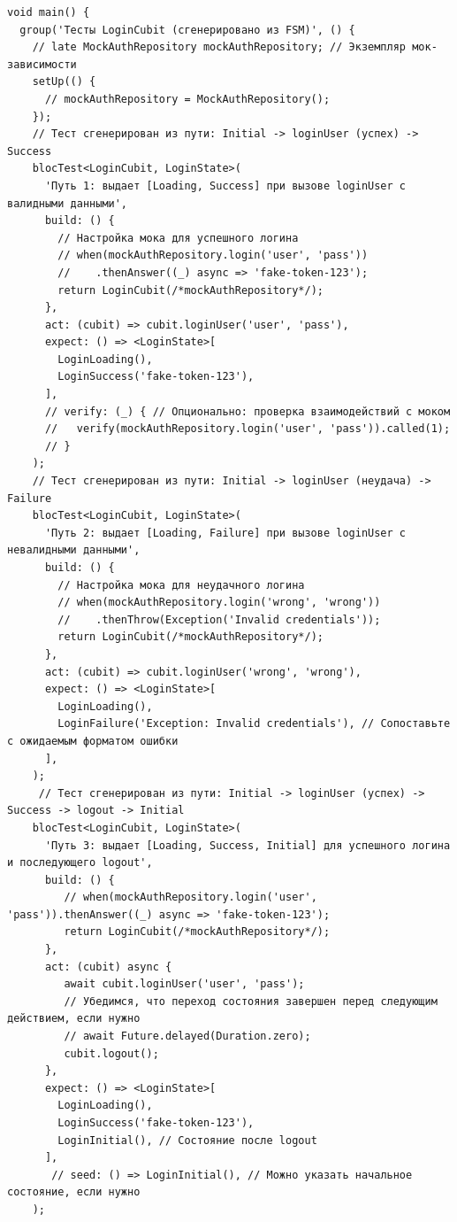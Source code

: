 \documentclass[14pt, russian]{scrartcl}
\begin{document}
\newpage
\begin{listing}[!htb]
\caption{Пример сгенерированного теста Cubit (Dart, bloc\_test) - продолжение}
\begin{verbatim}
void main() {
  group('Тесты LoginCubit (сгенерировано из FSM)', () {
    // late MockAuthRepository mockAuthRepository; // Экземпляр мок-зависимости
    setUp(() {
      // mockAuthRepository = MockAuthRepository();
    });
    // Тест сгенерирован из пути: Initial -> loginUser (успех) -> Success
    blocTest<LoginCubit, LoginState>(
      'Путь 1: выдает [Loading, Success] при вызове loginUser с валидными данными',
      build: () {
        // Настройка мока для успешного логина
        // when(mockAuthRepository.login('user', 'pass'))
        //    .thenAnswer((_) async => 'fake-token-123');
        return LoginCubit(/*mockAuthRepository*/);
      },
      act: (cubit) => cubit.loginUser('user', 'pass'),
      expect: () => <LoginState>[
        LoginLoading(),
        LoginSuccess('fake-token-123'),
      ],
      // verify: (_) { // Опционально: проверка взаимодействий с моком
      //   verify(mockAuthRepository.login('user', 'pass')).called(1);
      // }
    );
    // Тест сгенерирован из пути: Initial -> loginUser (неудача) -> Failure
    blocTest<LoginCubit, LoginState>(
      'Путь 2: выдает [Loading, Failure] при вызове loginUser с невалидными данными',
      build: () {
        // Настройка мока для неудачного логина
        // when(mockAuthRepository.login('wrong', 'wrong'))
        //    .thenThrow(Exception('Invalid credentials'));
        return LoginCubit(/*mockAuthRepository*/);
      },
      act: (cubit) => cubit.loginUser('wrong', 'wrong'),
      expect: () => <LoginState>[
        LoginLoading(),
        LoginFailure('Exception: Invalid credentials'), // Сопоставьте с ожидаемым форматом ошибки
      ],
    );
     // Тест сгенерирован из пути: Initial -> loginUser (успех) -> Success -> logout -> Initial
    blocTest<LoginCubit, LoginState>(
      'Путь 3: выдает [Loading, Success, Initial] для успешного логина и последующего logout',
      build: () {
         // when(mockAuthRepository.login('user', 'pass')).thenAnswer((_) async => 'fake-token-123');
         return LoginCubit(/*mockAuthRepository*/);
      },
      act: (cubit) async {
         await cubit.loginUser('user', 'pass');
         // Убедимся, что переход состояния завершен перед следующим действием, если нужно
         // await Future.delayed(Duration.zero);
         cubit.logout();
      },
      expect: () => <LoginState>[
        LoginLoading(),
        LoginSuccess('fake-token-123'),
        LoginInitial(), // Состояние после logout
      ],
       // seed: () => LoginInitial(), // Можно указать начальное состояние, если нужно
    );
\end{verbatim}
\end{listing}
\end{document}

